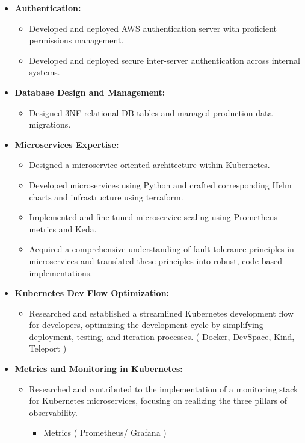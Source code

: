 \documentclass[10pt,a4paper]{altacv}
\begin{document}
\begin{itemize}
\item \textbf{Authentication:}
  \begin{itemize}
    \item Developed and deployed AWS authentication server with proficient permissions management.
    \item Developed and deployed secure inter-server authentication across internal systems.
  \end{itemize}
\item \textbf{Database Design and Management:}
  \begin{itemize}
    \item Designed 3NF relational DB tables  and managed production data migrations.
  \end{itemize}
\item \textbf{Microservices Expertise:}
  \begin{itemize}
    \item Designed a microservice-oriented architecture within Kubernetes.
    \item Developed microservices using Python and crafted corresponding Helm charts and infrastructure using terraform.
    \item Implemented and fine tuned microservice scaling using Prometheus metrics and Keda.
    \item Acquired a comprehensive understanding of fault tolerance principles in microservices and translated these principles into robust, code-based implementations.
  \end{itemize}
\item \textbf{Kubernetes Dev Flow Optimization:}
  \begin{itemize}
    \item Researched and established a streamlined Kubernetes development flow for developers, optimizing the development cycle by simplifying deployment, testing, and iteration processes. ( Docker, DevSpace, Kind, Teleport ) 
  \end{itemize}
\item \textbf{Metrics and Monitoring in Kubernetes:}
  \begin{itemize}
    \item Researched and contributed to the implementation of a monitoring stack for Kubernetes microservices, focusing on realizing the three pillars of observability.
    \begin{itemize}
        \item Metrics ( Prometheus/ Grafana )

\end{itemize}
\end{itemize}
\end{itemize}
\end{document}
